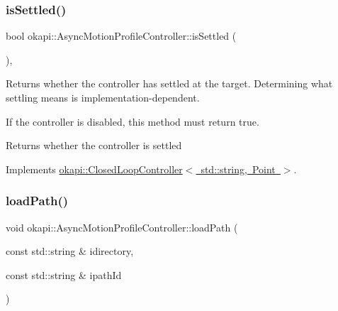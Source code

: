 \mbox{\label{classokapi_1_1AsyncMotionProfileController_abfc944ba6d703dc1aa6fb16a44b5e395}} 
\subsubsection{\texorpdfstring{isSettled()}{isSettled()}}
{\footnotesize\ttfamily bool okapi\+::\+Async\+Motion\+Profile\+Controller\+::is\+Settled (\begin{DoxyParamCaption}{ }\end{DoxyParamCaption})\hspace{0.3cm}{\ttfamily [override]}, {\ttfamily [virtual]}}

Returns whether the controller has settled at the target. Determining what settling means is implementation-\/dependent.

If the controller is disabled, this method must return true.

\begin{DoxyReturn}{Returns}
whether the controller is settled 
\end{DoxyReturn}


Implements \mbox{\hyperlink{classokapi_1_1ClosedLoopController_aed7aa0e94b6474c28314f8517d6cb4d8}{okapi\+::\+Closed\+Loop\+Controller$<$ std\+::string, Point $>$}}.

\mbox{\label{classokapi_1_1AsyncMotionProfileController_a87c74350a819a3a322321be787c32d1f}} 
\subsubsection{\texorpdfstring{loadPath()}{loadPath()}}
{\footnotesize\ttfamily void okapi\+::\+Async\+Motion\+Profile\+Controller\+::load\+Path (\begin{DoxyParamCaption}\item[{const std\+::string \&}]{idirectory,  }\item[{const std\+::string \&}]{ipath\+Id }\end{DoxyParamCaption})}

